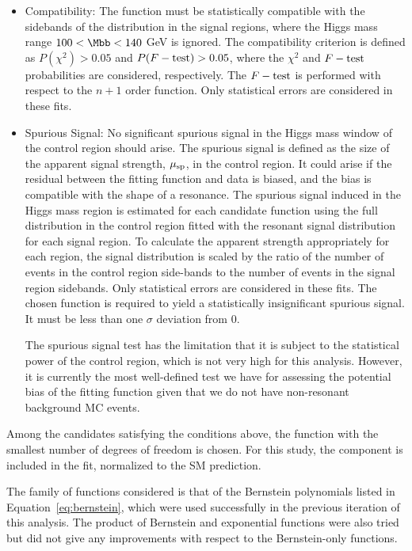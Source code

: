 \begin{itemize}
\item Compatibility: The function must be statistically 
compatible with the sidebands of the \Mbb{} distribution in the signal regions,
where the Higgs mass range $100<\Mbb<140$ GeV is ignored. The compatibility criterion is defined as $P(\chi^2)>0.05$ and $P(F-\rm{test})>0.05$, 
where the $\chi^2$ and $F-\rm{test}$ probabilities are considered, respectively.
The $F-\rm{test}$ is performed with respect to the $n+1$ order function.  Only statistical errors are considered in these fits. 

\item Spurious Signal: No significant spurious signal in the Higgs mass window of the control region should arise.  The spurious signal is defined as the size of the apparent signal strength, $\mu_{\rm sp}$, in the control region.  It could arise if the residual between the fitting function and data is biased, and the bias is compatible with the shape of a resonance. The spurious signal induced in the Higgs mass region is estimated 
for each candidate function using the full \Mbb{} distribution in the control region
fitted with the resonant signal distribution for each signal region.
To calculate the apparent strength appropriately for each region, the signal distribution is scaled by the ratio of the number of events in the control region side-bands to the number of events in the signal region sidebands.%
Only statistical errors are considered in these fits. The chosen function is required 
to yield a statistically insignificant spurious signal.  It must be less than one $\sigma$  deviation from 0.  

The spurious signal test has the limitation that it is subject to the statistical power of the control region, which is not very high for this analysis.  However, it is currently the most well-defined test we have for assessing the potential bias of the fitting function given that we do not have non-resonant background MC events.

\end{itemize}

 
Among the candidates satisfying the conditions above, the function with the smallest
number of degrees of freedom is chosen.
For this study, the \zjets{} component is included in the fit, 
normalized to the SM prediction.

The family of functions considered is that of the Bernstein polynomials listed in Equation~\ref{eq:bernstein}, which were
used successfully in the previous iteration of this analysis.  The product of Bernstein and exponential functions were also tried but did not give any improvements with respect to the Bernstein-only functions.

